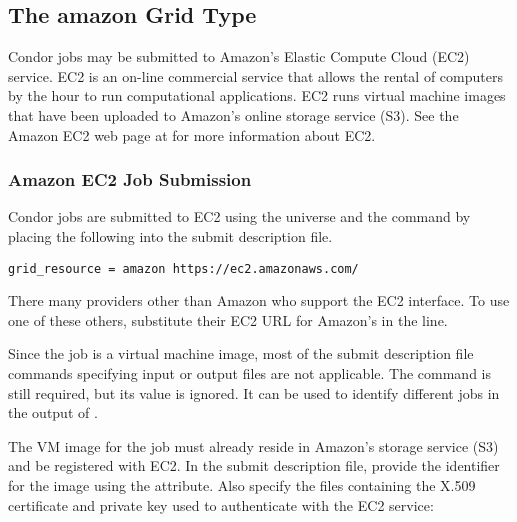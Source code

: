 \subsection{\label{sec:Amazon}The amazon Grid Type }

Condor jobs may be submitted to Amazon's Elastic Compute Cloud (EC2)
service.
EC2 is an on-line commercial service that allows the rental of computers
by the hour to run computational applications.
EC2 runs virtual machine images that have been uploaded to Amazon's
online storage service (S3).
See the Amazon EC2 web page at  for more
information about EC2.

\subsubsection{\label{sec:Amazon-submit}Amazon EC2 Job Submission}

Condor jobs are submitted to EC2
using the  universe and the
 command  by placing the following
into the submit description file.
\begin{verbatim}
grid_resource = amazon https://ec2.amazonaws.com/
\end{verbatim}

There many providers other than Amazon who support the EC2 interface.
To use one of these others, substitute their EC2 URL for Amazon's in the
 line.

Since the job is a virtual machine image,
most of the submit description file commands
specifying input or output files are not applicable.
The  command is still required,
but its value is ignored. 
It can be used to identify different jobs in the output of .

The VM image for the job must already reside in Amazon's storage
service (S3) and be registered with EC2.
In the submit description file,
provide the identifier for the image using the
 attribute.
Also specify the files containing the X.509 certificate and
private key used to authenticate with the EC2 service:

